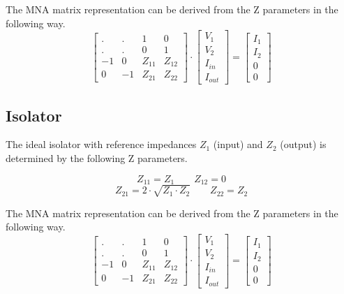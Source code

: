\documentclass[10pt]{report}
\begin{document}
The MNA matrix representation can be derived from the Z parameters in the
following way.
\begin{equation}
\begin{bmatrix}
 . & .  &  1 & 0\\
 . & .  &  0 & 1\\
-1 &  0 & Z_{11} & Z_{12}\\
 0 & -1 & Z_{21} & Z_{22}
\end{bmatrix}
\cdot
\begin{bmatrix}
V_{1}\\
V_{2}\\
I_{in}\\
I_{out}
\end{bmatrix}
=
\begin{bmatrix}
I_{1}\\
I_{2}\\
0\\
0
\end{bmatrix}
\end{equation}


\subsection{Isolator}

The ideal isolator with reference impedances $Z_1$ (input) and $Z_2$
(output) is determined by the following Z parameters.

\begin{equation}
Z_{11} = Z_1  \qquad
Z_{12} = 0
\end{equation}
\begin{equation}
Z_{21} = 2\cdot\sqrt{Z_1\cdot Z_2}  \qquad
Z_{22} = Z_2
\end{equation}

The MNA matrix representation can be derived from the Z parameters in the
following way.
\begin{equation}
\begin{bmatrix}
 . & .  &  1 & 0\\
 . & .  &  0 & 1\\
-1 &  0 & Z_{11} & Z_{12}\\
 0 & -1 & Z_{21} & Z_{22}
\end{bmatrix}
\cdot
\begin{bmatrix}
V_{1}\\
V_{2}\\
I_{in}\\
I_{out}
\end{bmatrix}
=
\begin{bmatrix}
I_{1}\\
I_{2}\\
0\\
0
\end{bmatrix}
\end{equation}
\end{document}

